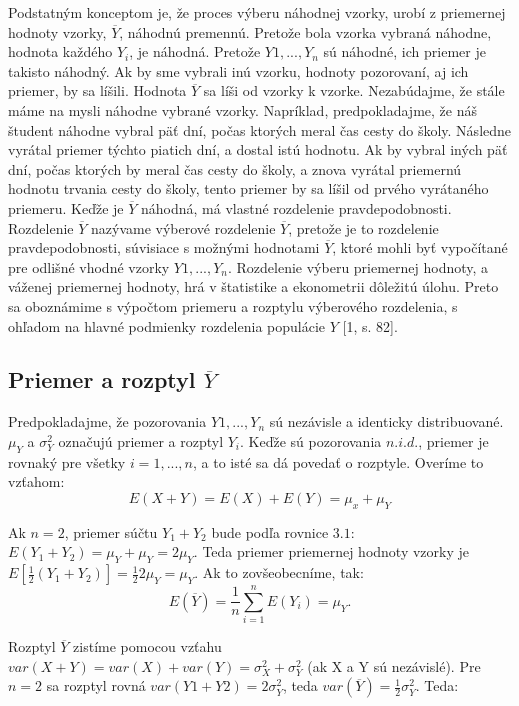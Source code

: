 \documentclass[]{tukediphc}
\begin{document}
Podstatným konceptom je, že proces výberu náhodnej vzorky, urobí z priemernej hodnoty vzorky, $\overline{Y}$, náhodnú premennú. Pretože bola vzorka vybraná náhodne, hodnota každého $Y_i$, je náhodná. Pretože $Y1, ..., Y_n$ sú náhodné, ich priemer je takisto náhodný. Ak by sme vybrali inú vzorku, hodnoty pozorovaní, aj ich priemer, by sa líšili. Hodnota $\overline{Y}$ sa líši od vzorky k vzorke. Nezabúdajme, že stále máme na mysli náhodne vybrané vzorky. Napríklad, predpokladajme, že náš študent náhodne vybral päť dní, počas ktorých meral čas cesty do školy. Následne vyrátal priemer týchto piatich dní, a dostal istú hodnotu. Ak by vybral iných päť dní, počas ktorých by meral čas cesty do školy, a znova vyrátal priemernú hodnotu trvania cesty do školy, tento priemer by sa líšil od prvého vyrátaného priemeru. Keďže je $\overline{Y}$ náhodná, má vlastné rozdelenie pravdepodobnosti. Rozdelenie $\overline{Y}$ nazývame výberové rozdelenie $\overline{Y}$, pretože je to rozdelenie pravdepodobnosti, súvisiace s možnými hodnotami $\overline{Y}$, ktoré mohli byť vypočítané pre odlišné vhodné vzorky $Y1, ..., Y_n$. Rozdelenie výberu priemernej hodnoty, a váženej priemernej hodnoty, hrá v štatistike a ekonometrii dôležitú úlohu. Preto sa oboznámime s výpočtom priemeru a rozptylu výberového rozdelenia, s ohľadom na hlavné podmienky rozdelenia populácie $Y$ [1, s. 82].

\subsection{Priemer a rozptyl $\overline{Y}$ }

Predpokladajme, že pozorovania $Y1, ..., Y_n$ sú nezávisle a identicky distribuované. $\mu_Y$ a $\sigma^2_Y$ označujú priemer a rozptyl $Y_i$. Keďže sú pozorovania $n.i.d.$, priemer je rovnaký pre všetky $i = 1, ..., n$, a to isté sa dá povedať o rozptyle. Overíme to vzťahom:  
\begin{equation}
E(X+Y)=E(X)+E(Y)=\mu_x+\mu_Y    
\end{equation} 

Ak $n = 2$, priemer súčtu $Y_1 + Y_2$ bude podľa rovnice $3.1$: $E(Y_1+Y_2) = \mu_Y + \mu_Y = 2\mu_Y$. Teda priemer priemernej hodnoty vzorky je $E[\frac{1}{2}(Y_1 + Y_2)]= \frac{1}{2}2\mu_Y=\mu_Y$. Ak to zovšeobecníme, tak:
\begin{equation}
E(\overline{Y}) = \frac{1}{n}\sum_{i=1}^{n}E(Y_i) = \mu_Y.
\end{equation}


Rozptyl $\overline{Y}$ zistíme pomocou vzťahu $var(X + Y) = var(X) + var(Y) = \sigma^2_X + \sigma^2_Y$ (ak X a Y sú nezávislé). Pre $n = 2$ sa rozptyl rovná $var(Y1 + Y2) = 2\sigma^2_Y$, teda $var(\overline{Y}) =  \frac{1}{2} \sigma^2_Y$. Teda: 
\end{document}
